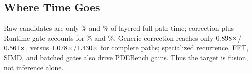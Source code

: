 \subsection{Where Time Goes}

Raw candidates are only \LinearCandidateSharePercent\% and
\NonlinearCandidateSharePercent\% of layered full-path time; correction plus Runtime
gate accounts for \LinearCorrectionGateSharePercent\% and
\NonlinearCorrectionGateSharePercent\%. Generic correction reaches only
$0.898\times$/$0.561\times$, versus
$1.078\times$/$1.430\times$ for complete paths;
specialized recurrence, FFT, SIMD, and batched gates also drive PDEBench gains. Thus
the target is fusion, not inference alone.

